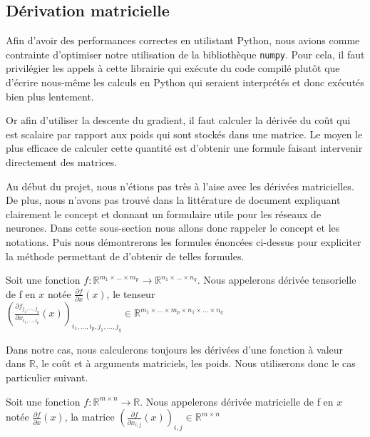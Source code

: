 \subsection{Dérivation matricielle}

Afin d'avoir des performances correctes en utilistant Python, nous avions comme contrainte d'optimiser notre utilisation de la bibliothèque \texttt{numpy}. Pour cela, il faut privilégier les appels à cette librairie qui exécute du code compilé plutôt que d'écrire nous-même les calculs en Python qui seraient interprétés et donc exécutés bien plus lentement.

Or afin d'utiliser la descente du gradient, il faut calculer la dérivée du coût qui est scalaire par rapport aux poids qui sont stockés dans une matrice. Le moyen le plus efficace  de calculer cette quantité est d'obtenir une formule faisant intervenir directement des matrices.

Au début du projet, nous n'étions pas très à l'aise avec les dérivées matricielles. De plus, nous n'avons pas trouvé dans la littérature de document expliquant clairement le concept et donnant un formulaire utile pour les réseaux de neurones. Dans cette sous-section nous allons donc rappeler le concept et les notations. Puis nous démontrerons les formules énoncées ci-dessus pour expliciter la méthode permettant de d'obtenir de telles formules.

\begin{definition}
Soit une fonction $f : \mathbb{R}^{m_1 \times ... \times m_p} \rightarrow \mathbb{R}^{n_1 \times ... \times n_q}$. Nous appelerons dérivée tensorielle de f en $x$ notée $\frac{\partial f}{\partial x}(x)$, le tenseur $(\frac{\partial f_{j_1, ..., j_q}}{\partial x_{i_1, ..., i_p}}(x))_{i_1, ..., i_p, j_1, ..., j_q} \in  \mathbb{R}^{m_1 \times ... \times m_p \times n_1 \times ... \times n_q}$ 
\end{definition}

Dans notre cas, nous calculerons toujours les dérivées d'une fonction à valeur dans $\mathbb{R}$, le coût et à arguments matriciels, les poids. Nous utiliserons donc le cas particulier suivant.

\begin{definition}
Soit une fonction $f : \mathbb{R}^{m \times n} \rightarrow \mathbb{R}$. Nous appelerons dérivée matricielle de f en $x$ notée $\frac{\partial f}{\partial x}(x)$, la matrice $(\frac{\partial f}{\partial x_{i, j}}(x))_{i, j} \in  \mathbb{R}^{m \times n}$ 
\end{definition}

